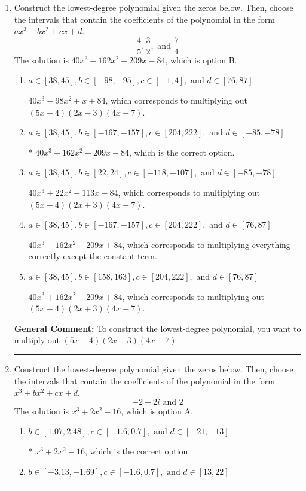 \documentclass{extbook}[14pt]
\newcommand{\litem}[1]{\item #1

\rule{\textwidth}{0.4pt}}
\begin{document}
\begin{enumerate}\litem{
Construct the lowest-degree polynomial given the zeros below. Then, choose the intervals that contain the coefficients of the polynomial in the form $ax^3+bx^2+cx+d$.
\[ \frac{4}{5}, \frac{3}{2}, \text{ and } \frac{7}{4} \]The solution is \( 40x^{3} -162 x^{2} +209 x -84 \), which is option B.\begin{enumerate}[label=\Alph*.]
\item \( a \in [38, 45], b \in [-98, -95], c \in [-1, 4], \text{ and } d \in [76, 87] \)

$40x^{3} -98 x^{2} +x + 84$, which corresponds to multiplying out $(5x + 4)(2x -3)(4x -7)$.
\item \( a \in [38, 45], b \in [-167, -157], c \in [204, 222], \text{ and } d \in [-85, -78] \)

* $40x^{3} -162 x^{2} +209 x -84$, which is the correct option.
\item \( a \in [38, 45], b \in [22, 24], c \in [-118, -107], \text{ and } d \in [-85, -78] \)

$40x^{3} +22 x^{2} -113 x -84$, which corresponds to multiplying out $(5x + 4)(2x + 3)(4x -7)$.
\item \( a \in [38, 45], b \in [-167, -157], c \in [204, 222], \text{ and } d \in [76, 87] \)

$40x^{3} -162 x^{2} +209 x + 84$, which corresponds to multiplying everything correctly except the constant term.
\item \( a \in [38, 45], b \in [158, 163], c \in [204, 222], \text{ and } d \in [76, 87] \)

$40x^{3} +162 x^{2} +209 x + 84$, which corresponds to multiplying out $(5x + 4)(2x + 3)(4x + 7)$.
\end{enumerate}

\textbf{General Comment:} To construct the lowest-degree polynomial, you want to multiply out $(5x -4)(2x -3)(4x -7)$
}
\litem{
Construct the lowest-degree polynomial given the zeros below. Then, choose the intervals that contain the coefficients of the polynomial in the form $x^3+bx^2+cx+d$.
\[ -2 + 2 i \text{ and } 2 \]The solution is \( x^{3} +2 x^{2} -16 \), which is option A.\begin{enumerate}[label=\Alph*.]
\item \( b \in [1.07, 2.48], c \in [-1.6, 0.7], \text{ and } d \in [-21, -13] \)

* $x^{3} +2 x^{2} -16$, which is the correct option.
\item \( b \in [-3.13, -1.69], c \in [-1.6, 0.7], \text{ and } d \in [13, 22] \)


\end{enumerate}}
\end{enumerate}
\end{document}
